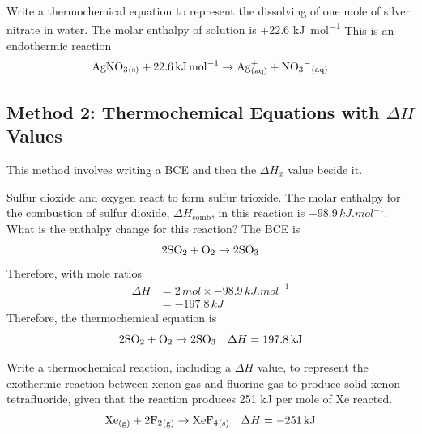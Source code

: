 \begin{sample}{Write a thermochemical equation to represent the dissolving of one mole of silver
    nitrate in water. The molar enthalpy of solution is +22.6 \si{kJ.mol^{-1}}}
    This is an endothermic reaction
    \[
        \ch{AgNO3_{(s)}}+22.6\,\si{kJ.mol^{-1}}\to \ch{Ag^+_{(aq)}}+\ch{NO3^-_{(aq)}}
    \]
\end{sample}

\subsection{Method 2: Thermochemical Equations with $\Delta H$ Values}
This method involves writing a BCE and then the $\Delta H_x$ value beside it. 

\begin{sample}{Sulfur dioxide and oxygen react to form sulfur trioxide. The molar enthalpy for the
        combustion of sulfur dioxide, $\Delta H_\text{comb}$, in this reaction is $-98.9\,\si{kJ.mol^{-1}}$.
        What is the enthalpy change for this reaction?
    }
    The BCE is
    \[
        2\ch{SO2}+\ch{O2}\to 2\ch{SO3}
    \]
    Therefore, with mole ratios
    \begin{align*}
        \Delta H&=2\,\si{mol}\times-98.9\,\si{kJ.mol^{-1}}\\
                &=-197.8\,\si{kJ}
    \end{align*}
    Therefore, the thermochemical equation is
    \[
        2\ch{SO2}+\ch{O2}\to 2\ch{SO3}\quad\Delta H=197.8\,\si{kJ}
    \]
\end{sample}

\begin{sample}{Write a thermochemical reaction, including a $\Delta H$ value, to represent the
    exothermic reaction between xenon gas and fluorine gas to produce solid xenon tetrafluoride,
    given that the reaction produces 251 kJ per mole of Xe reacted.}
    \[
        \ch{Xe_{(g)}}+2\ch{F2_{(g)}}\to \ch{XeF4_{(s)}}\quad\Delta H=-251\,\si{kJ}
    \]
\end{sample}

